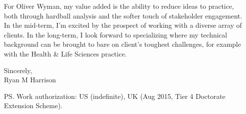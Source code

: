 \documentclass[a4paper]{../res}
\begin{document}
\begin{sloppypar}
\begin{resume}

For Oliver Wyman, my value added is the ability to reduce ideas to practice, both through hardball analysis and the softer touch of stakeholder engagement. In the mid-term, I'm excited by the prospect of working with a diverse array of clients. In the long-term, I look forward to specializing where my technical background can be brought to bare on client's toughest challenges, for example with the Health \& Life Sciences practice.


Sincerely, \\
Ryan M Harrison

PS. Work authorization: US (indefinite), UK (Aug 2015, Tier 4 Doctorate Extension Scheme).

\end{resume} 
\end{sloppypar}
\end{document}
